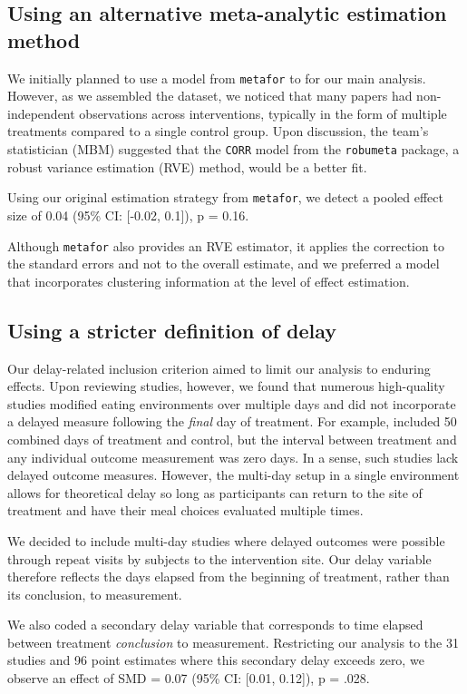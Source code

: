 \documentclass[sn-nature,referee,lineno,pdflatex]{sn-jnl}
\begin{document}
\subsection{Using an alternative meta-analytic estimation
method}\label{using-an-alternative-meta-analytic-estimation-method}

We initially planned to use a model from \texttt{metafor} to for our
main analysis. However, as we assembled the dataset, we noticed that
many papers had non-independent observations across interventions,
typically in the form of multiple treatments compared to a single
control group. Upon discussion, the team's statistician (MBM) suggested
that the \texttt{CORR} model from the \texttt{robumeta} package, a
robust variance estimation (RVE) method, would be a better fit.

Using our original estimation strategy from \texttt{metafor}, we detect
a pooled effect size of 0.04 (95\% CI: {[}-0.02, 0.1{]}), p = 0.16.

Although \texttt{metafor} also provides an RVE estimator, it applies the
correction to the standard errors and not to the overall estimate, and
we preferred a model that incorporates clustering information at the
level of effect estimation.

\subsection{Using a stricter definition of
delay}\label{using-a-stricter-definition-of-delay}

Our delay-related inclusion criterion aimed to limit our analysis to
enduring effects. Upon reviewing studies, however, we found that
numerous high-quality studies modified eating environments over multiple
days and did not incorporate a delayed measure following the
\emph{final} day of treatment. For example, \citep{andersson2021}
included 50 combined days of treatment and control, but the interval
between treatment and any individual outcome measurement was zero days.
In a sense, such studies lack delayed outcome measures. However, the
multi-day setup in a single environment allows for theoretical delay so
long as participants can return to the site of treatment and have their
meal choices evaluated multiple times.

We decided to include multi-day studies where delayed outcomes were
possible through repeat visits by subjects to the intervention site. Our
delay variable therefore reflects the days elapsed from the beginning of
treatment, rather than its conclusion, to measurement.

We also coded a secondary delay variable that corresponds to time
elapsed between treatment \emph{conclusion} to measurement. Restricting
our analysis to the 31 studies and 96 point estimates where this
secondary delay exceeds zero, we observe an effect of SMD = 0.07 (95\%
CI: {[}0.01, 0.12{]}), p = .028.


\end{document}
